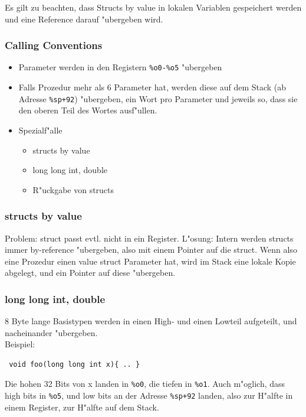\documentclass[german, 10pt, a4paper, twocolumn]{scrartcl}
\begin{document}
Es gilt zu beachten, dass Structs by value in lokalen Variablen gespeichert werden und eine Reference darauf "ubergeben wird.

\twocolumn

\subsubsection{Calling Conventions}

\begin{itemize}
	\item Parameter werden in den Registern \verb#%o0-%o5# "ubergeben
	\item Falls Prozedur mehr als 6 Parameter hat, werden diese auf dem Stack (ab Adresse \verb#%sp+92#) "ubergeben, ein Wort pro Parameter und jeweils so, dass sie den oberen Teil des Wortes ausf"ullen.
	\item Spezialf"alle
		\begin{itemize}
			\item structs by value
			\item long long int, double
			\item R"uckgabe von structs
		\end{itemize}
\end{itemize}

\subsubsection{structs by value}

Problem: struct passt evtl. nicht in ein Register. L"osung: Intern werden structs immer by-reference "ubergeben, also mit einem Pointer auf die struct. Wenn also eine Prozedur einen value struct Parameter hat, wird im Stack eine lokale Kopie abgelegt, und ein Pointer auf diese "ubergeben.

\subsubsection{long long int, double}

8 Byte lange Basistypen werden in einen High- und einen Lowteil aufgeteilt, und nacheinander "ubergeben.\\

Beispiel:
\begin{verbatim}
 void foo(long long int x){ .. }
\end{verbatim}

Die hohen 32 Bits von x landen in \verb#%o0#, die tiefen in \verb#%o1#. Auch m"oglich, dass high bits in \verb#%o5#, und low bits an der Adresse \verb#%sp+92# landen, also zur H"alfte in einem Register, zur H"alfte auf dem Stack.
\end{document}
